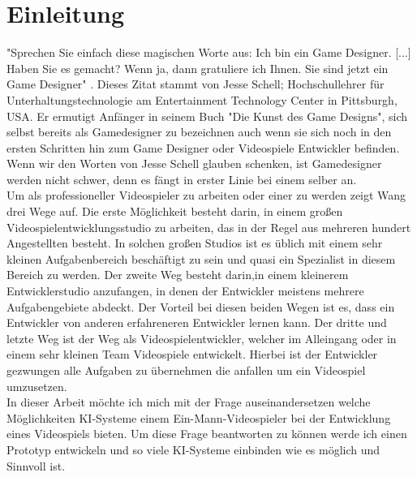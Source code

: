 \chapter{Einleitung}

"Sprechen Sie einfach diese magischen Worte aus: Ich bin ein Game Designer. [...] Haben Sie es gemacht? Wenn ja, dann gratuliere ich Ihnen. Sie sind jetzt ein Game Designer" \autocite[S. 37]{schell2020}.
Dieses Zitat stammt von Jesse Schell; Hochschullehrer für Unterhaltungstechnologie am Entertainment Technology Center in Pittsburgh, USA. Er ermutigt Anfänger in seinem Buch "Die Kunst des Game Designs", sich selbst bereits als Gamedesigner zu bezeichnen auch wenn sie sich noch in den ersten Schritten hin zum Game Designer oder Videospiele Entwickler befinden. 
Wenn wir den Worten von Jesse Schell glauben schenken, ist Gamedesigner werden nicht schwer, denn es fängt in erster Linie bei einem selber an. 
\\
Um als professioneller Videospieler zu arbeiten oder einer zu werden zeigt Wang \autocite[S.251]{wang2023} drei Wege auf. Die erste Möglichkeit besteht darin, in einem großen Videospielentwicklungsstudio zu arbeiten, das in der Regel aus mehreren hundert Angestellten besteht. In solchen großen Studios ist es üblich mit einem sehr kleinen Aufgabenbereich beschäftigt zu sein und quasi ein Spezialist in diesem Bereich zu werden. Der zweite Weg besteht darin,in einem kleinerem Entwicklerstudio anzufangen, in denen der Entwickler meistens mehrere Aufgabengebiete abdeckt. Der Vorteil bei diesen beiden Wegen ist es, dass ein Entwickler von anderen erfahreneren Entwickler lernen kann. Der dritte und letzte Weg ist der Weg als Videospielentwickler, welcher im Alleingang oder in einem sehr kleinen Team Videospiele entwickelt. Hierbei ist der Entwickler gezwungen alle Aufgaben zu übernehmen die anfallen um ein Videospiel umzusetzen.
\\
In dieser Arbeit möchte ich mich mit der Frage auseinandersetzen welche Möglichkeiten KI-Systeme einem Ein-Mann-Videospieler bei der Entwicklung eines Videospiels bieten. Um diese Frage beantworten zu können werde ich einen Prototyp entwickeln und so viele KI-Systeme einbinden wie es möglich und Sinnvoll ist.

